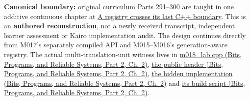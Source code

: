 \hypertarget{appendix-fd090d982a15-m018-parts-291300-the-same-asset-service-becomes-a-typed-hidden-and-measurable-engine-api}{}

\textbf{Canonical boundary:} original curriculum Parts 291--300 are taught in one additive continuous chapter at \hyperref[01-foundations-i-ch007-a-registry-crosses-its-last-c-boundary-hidden-implementation-typed-identity-and-measured-abstraction-cost]{A registry crosses its last C++ boundary}. This is an \textbf{authored reconstruction}, not a newly received transcript, independent learner assessment or Kairo implementation audit. The design continues directly from M017's separately compiled API and M015--M016's generation-aware registry. The actual multi-translation-unit witness lives in \href{../01-Bits-Programs-and-Reliable-Systems-P02/main.pdf\#nameddest=source-file-8aedc3fdcd10c91971507448}{m018\_lab.cpp (Bits, Programs, and Reliable Systems, Part 2, Ch. 2)}, \href{../01-Bits-Programs-and-Reliable-Systems-P02/main.pdf\#nameddest=source-file-0529c78555b675a2ae111228}{the public header (Bits, Programs, and Reliable Systems, Part 2, Ch. 2)}, \href{../01-Bits-Programs-and-Reliable-Systems-P02/main.pdf\#nameddest=source-file-04abded74b7e03edc5dcf870}{the hidden implementation (Bits, Programs, and Reliable Systems, Part 2, Ch. 2)} and \href{../01-Bits-Programs-and-Reliable-Systems-P02/main.pdf\#nameddest=source-file-c936569afa19be638ec87991}{its build script (Bits, Programs, and Reliable Systems, Part 2, Ch. 2)}.

